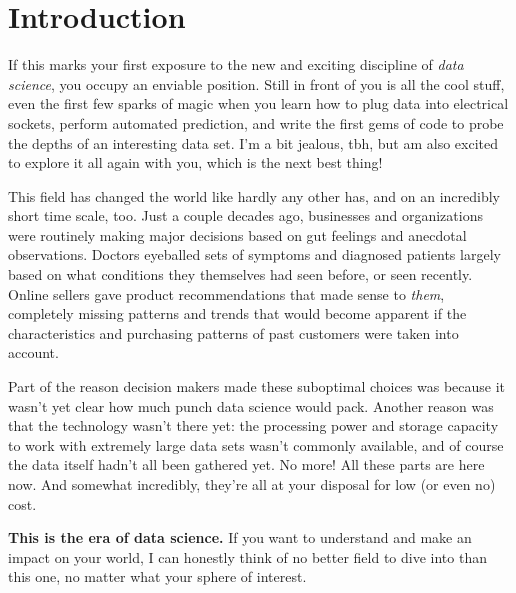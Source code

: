 
\chapter{Introduction}
\label{ch:intro}

If this marks your first exposure to the new and exciting discipline of
\textit{data science}, you occupy an enviable position. Still in front of you
is all the cool stuff, even the first few sparks of magic when you learn how to
plug data into electrical sockets, perform automated prediction, and write the
first gems of code to probe the depths of an interesting data set. I'm a bit
jealous, tbh, but am also excited to explore it all again with you, which is
the next best thing!

This field has changed the world like hardly any other has, and on an
incredibly short time scale, too. Just a couple decades ago, businesses and
organizations were routinely making major decisions based on gut feelings and
anecdotal observations. Doctors eyeballed sets of symptoms and diagnosed
patients largely based on what conditions they themselves had seen before, or
seen recently. Online sellers gave product recommendations that made sense to
\textit{them}, completely missing patterns and trends that would become
apparent if the characteristics and purchasing patterns of past customers were
taken into account.

Part of the reason decision makers made these suboptimal choices was because it
wasn't yet clear how much punch data science would pack. Another reason was
that the technology wasn't there yet: the processing power and storage capacity
to work with extremely large data sets wasn't commonly available, and of course
the data itself hadn't all been gathered yet. No more! All these parts are here
now. And somewhat incredibly, they're all at your disposal for low (or even no)
cost.

\textbf{This is the era of data science.} If you want to understand and make an
impact on your world, I can honestly think of no better field to dive into than
this one, no matter what your sphere of interest.




